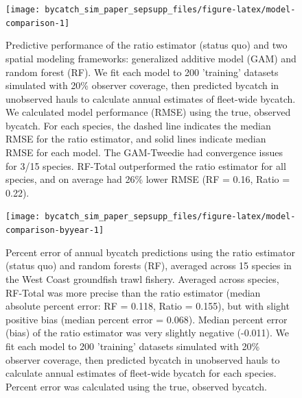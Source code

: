 \documentclass[]{article}
\begin{document}
\begin{figure}

{\centering \texttt{[image: bycatch\_sim\_paper\_sepsupp\_files/figure-latex/model-comparison-1]} 

}

\caption{Predictive performance of the ratio estimator (status quo) and two spatial modeling frameworks: generalized additive model (GAM) and random forest (RF). We fit each model to 200 'training' datasets simulated with 20\% observer coverage, then predicted bycatch in unobserved hauls to calculate annual estimates of fleet-wide bycatch. We calculated model performance (RMSE) using the true, observed bycatch. For each species, the dashed line indicates the median RMSE for the ratio estimator, and solid lines indicate median RMSE for each model. The GAM-Tweedie had convergence issues for 3/15 species. RF-Total outperformed the ratio estimator for all species, and on average had 26\% lower RMSE (RF = 0.16, Ratio = 0.22).}\label{fig:model-comparison}
\end{figure}

\pagebreak

\begin{figure}

{\centering \texttt{[image: bycatch\_sim\_paper\_sepsupp\_files/figure-latex/model-comparison-byyear-1]} 

}

\caption{Percent error of annual bycatch predictions using the ratio estimator (status quo) and random forests (RF), averaged across 15 species in the West Coast groundfish trawl fishery. Averaged across species, RF-Total was more precise than the ratio estimator (median absolute percent error: RF = 0.118, Ratio = 0.155), but with slight positive bias (median percent error = 0.068). Median percent error (bias) of the ratio estimator was very slightly negative (-0.011). We fit each model to 200 'training' datasets simulated with 20\% observer coverage, then predicted bycatch in unobserved hauls to calculate annual estimates of fleet-wide bycatch for each species. Percent error was calculated using the true, observed bycatch.}\label{fig:model-comparison-byyear}
\end{figure}

\pagebreak
\end{document}
